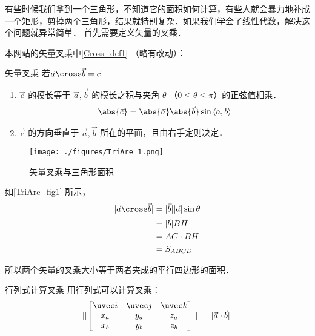 

有些时候我们拿到一个三角形，不知道它的面积如何计算，有些人就会暴力地补成一个矩形，剪掉两个三角形，结果就特别复杂．如果我们学会了线性代数，解决这个问题就异常简单．
首先需要定义矢量的叉乘．

本网站的矢量叉乘中\autoref{Cross_def1} （略有改动）：
\begin{definition}{矢量叉乘} \label{TriAre_def1}
若$\vec a \cross \vec b = \vec c $
\begin{enumerate}s
\item $\vec c$ 的模长等于 $\vec a, \vec b$ 的模长之积与夹角 $\theta$ （$0 \leqslant \theta \leqslant \pi$）的正弦值相乘．
\begin{equation}\label{TriAre_eq1}
\abs{\vec c}  = \abs{\vec a} \abs{\vec b} \sin\left<a, b \right>
\end{equation}
\item $\vec c$ 的方向垂直于 $\vec a, \vec b$ 所在的平面，且由右手定则决定．
\end{enumerate}
\end{definition}
\begin{figure}[ht]
\centering
\texttt{[image: ./figures/TriAre\_1.png]}
\caption{矢量叉乘与三角形面积} \label{TriAre_fig1}
\end{figure}
如\autoref{TriAre_fig1} 所示，
\begin{equation}
\begin{aligned}
\lvert\vec a \cross \vec b\rvert &= \lvert\vec b\rvert \lvert\vec a\rvert\sin\theta \\
&= \lvert\vec b\rvert BH \\
&= AC \cdot BH \\
&= S_{ABCD}
\end{aligned}
\end{equation}

所以两个矢量的叉乘大小等于两者夹成的平行四边形的面积．
\begin{lemma}{行列式计算叉乘}
用行列式可以计算叉乘：
\begin{equation}
\lvert\lvert \begin{bmatrix}
\uvec i & \uvec j & \uvec k \\
x_a & y_a & z_a\\
x_b & y_b & z_b
\end{bmatrix}\rvert\rvert = \lvert\lvert \vec a \cdot \vec b \rvert\rvert
\end{equation}
\end{lemma}

